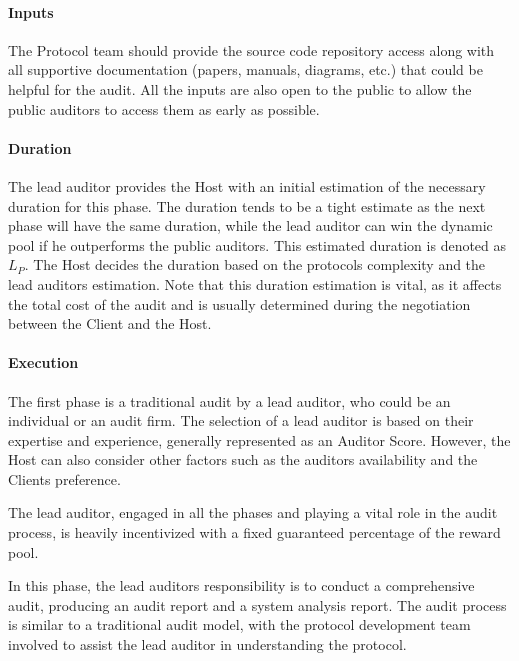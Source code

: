 \documentclass[10pt]{extarticle}
\begin{document}
\paragraph{Inputs}\label{inputs}

The Protocol team should provide the source code repository access along
with all supportive documentation (papers, manuals, diagrams, etc.) that
could be helpful for the audit. All the inputs are also open to the
public to allow the public auditors to access them as early as possible.

\paragraph{Duration}\label{duration}

The lead auditor provides the Host with an initial estimation of the
necessary duration for this phase. The duration tends to be a tight
estimate as the next phase will have the same duration, while the lead
auditor can win the dynamic pool if he outperforms the public auditors.
This estimated duration is denoted as \(L_P\). The Host decides the
duration based on the protocol\textquotesingle s complexity and the lead
auditor\textquotesingle s estimation. Note that this duration estimation
is vital, as it affects the total cost of the audit and is usually
determined during the negotiation between the Client and the Host.

\paragraph{Execution}\label{execution}

The first phase is a traditional audit by a lead auditor, who could be
an individual or an audit firm. The selection of a lead auditor is based
on their expertise and experience, generally represented as an Auditor
Score. However, the Host can also consider other factors such as the
auditor\textquotesingle s availability and the Client\textquotesingle s
preference.

The lead auditor, engaged in all the phases and playing a vital role in
the audit process, is heavily incentivized with a fixed guaranteed
percentage of the reward pool.

In this phase, the lead auditor\textquotesingle s responsibility is to
conduct a comprehensive audit, producing an audit report and a system
analysis report. The audit process is similar to a traditional audit
model, with the protocol development team involved to assist the lead
auditor in understanding the protocol.
\end{document}
